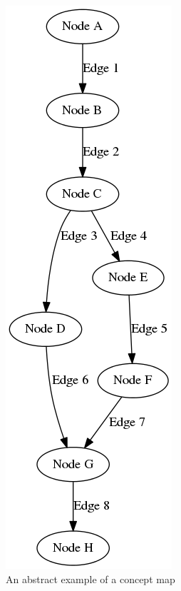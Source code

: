 \begin{figure}
    \centering
    \begin{subfigure}{0.4\textwidth}
        \centering
        \includegraphics[height=.6\textheight]{img/examplemap.png}
        \caption{An abstract example of a concept map}
        \label{fig:examplemap}
    \end{subfigure}
    \qquad
    \begin{subfigure}{0.4\textwidth}
        \centering

\end{subfigure}
\end{figure}
